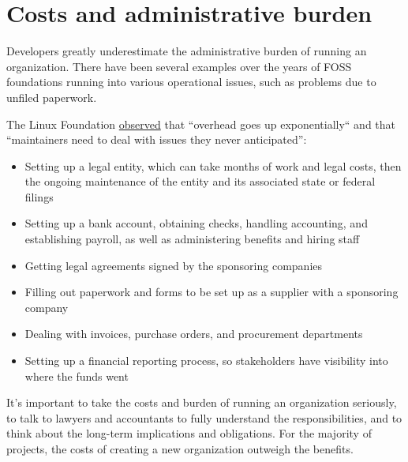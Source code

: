


\chapter{Costs and administrative burden}

Developers greatly underestimate the administrative burden of running an organization.  There have been several examples over the years of FOSS foundations running into various operational issues, such as problems due to unfiled paperwork.

The Linux Foundation \href{https://www.linuxfoundation.org/blog/the-linux-foundation-its-not-just-the-linux-operating-system/}{observed} that ``overhead goes up exponentially`` and that ``maintainers need to deal with issues they never anticipated'':

\begin{itemize}

\itemsep 0.50em

\item Setting up a legal entity, which can take months of work and legal costs, then the ongoing maintenance of the entity and its associated state or federal filings

\item Setting up a bank account, obtaining checks, handling accounting, and establishing payroll, as well as administering benefits and hiring staff

\item Getting legal agreements signed by the sponsoring companies

\item Filling out paperwork and forms to be set up as a supplier with a sponsoring company

\item Dealing with invoices, purchase orders, and procurement departments

\item Setting up a financial reporting process, so stakeholders have visibility into where the funds went

\end{itemize}

It's important to take the costs and burden of running an organization seriously, to talk to lawyers and accountants to fully understand the responsibilities, and to think about the long-term implications and obligations.  For the majority of projects, the costs of creating a new organization outweigh the benefits.

